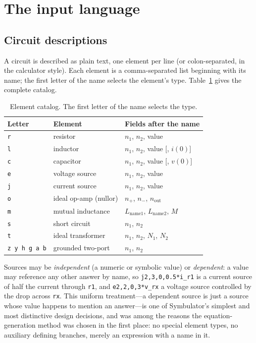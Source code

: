 \documentclass[11pt,oneside]{report}
\newcommand{\code}[1]{\texttt{#1}}
\begin{document}
\section{The input language}
\label{sec:input}

\subsection{Circuit descriptions}

A circuit is described as plain text, one element per line (or
colon-separated, in the calculator style). Each element is a
comma-separated list beginning with its name; the first letter of the
name selects the element's type. Table~\ref{tab:elements} gives the
complete catalog.

\begin{table}[htbp]
\caption{Element catalog. The first letter of the name selects the type.}
\label{tab:elements}
\centering
\begin{tabular}{@{}lll@{}}
\toprule
Letter & Element & Fields after the name \\
\midrule
\code{r} & resistor & $n_1$, $n_2$, value \\
\code{l} & inductor & $n_1$, $n_2$, value [, $i(0)$] \\
\code{c} & capacitor & $n_1$, $n_2$, value [, $v(0)$] \\
\code{e} & voltage source & $n_1$, $n_2$, value \\
\code{j} & current source & $n_1$, $n_2$, value \\
\code{o} & ideal op-amp (nullor) & $n_+$, $n_-$, $n_\mathrm{out}$ \\
\code{m} & mutual inductance & $L_\mathrm{name1}$, $L_\mathrm{name2}$, $M$ \\
\code{s} & short circuit & $n_1$, $n_2$ \\
\code{t} & ideal transformer & $n_1$, $n_2$, $N_1$, $N_2$ \\
\code{z y h g a b} & grounded two-port & $n_1$, $n_2$ \\
\bottomrule
\end{tabular}
\end{table}

Sources may be \emph{independent} (a numeric or symbolic value) or
\emph{dependent}: a value may reference any other answer by name, so
\code{j2,3,0,0.5*i\_r1} is a current source of half the current
through \code{r1}, and \code{e2,2,0,3*v\_rx} a voltage source
controlled by the drop across \code{rx}. This uniform treatment---a
dependent source is just a source whose value happens to mention an
answer---is one of Symbulator's simplest and most distinctive design
decisions, and was among the reasons the equation-generation method
was chosen in the first place: no special element types, no auxiliary
defining branches, merely an expression with a name in it.
\end{document}
